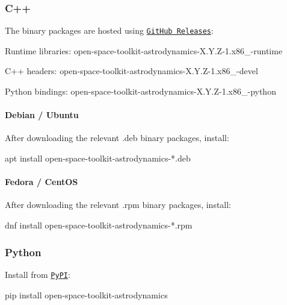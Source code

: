 \subsubsection*{C++}

The binary packages are hosted using \href{https://github.com/open-space-collective/open-space-toolkit-astrodynamics/releases}{\tt Git\+Hub Releases}\+:


\begin{DoxyItemize}
\item Runtime libraries\+: {\ttfamily open-\/space-\/toolkit-\/astrodynamics-\/\+X.\+Y.\+Z-\/1.\+x86\+\_-\/runtime}
\item C++ headers\+: {\ttfamily open-\/space-\/toolkit-\/astrodynamics-\/\+X.\+Y.\+Z-\/1.\+x86\+\_-\/devel}
\item Python bindings\+: {\ttfamily open-\/space-\/toolkit-\/astrodynamics-\/\+X.\+Y.\+Z-\/1.\+x86\+\_-\/python}
\end{DoxyItemize}

\paragraph*{Debian / Ubuntu}

After downloading the relevant {\ttfamily .deb} binary packages, install\+:


\begin{DoxyCode}
apt install open-space-toolkit-astrodynamics-*.deb
\end{DoxyCode}


\paragraph*{Fedora / Cent\+OS}

After downloading the relevant {\ttfamily .rpm} binary packages, install\+:


\begin{DoxyCode}
dnf install open-space-toolkit-astrodynamics-*.rpm
\end{DoxyCode}


\subsubsection*{Python}

Install from \href{https://pypi.org/project/open-space-toolkit-astrodynamics/}{\tt Py\+PI}\+:


\begin{DoxyCode}
pip install open-space-toolkit-astrodynamics
\end{DoxyCode}


